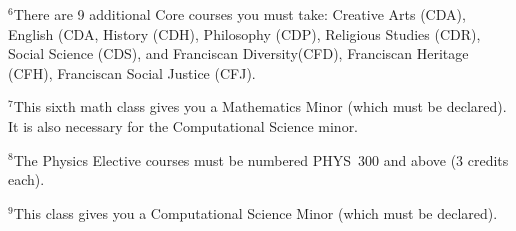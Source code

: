 \documentclass[12pt]{article}
\begin{document}
\hspace{0.1in}$^{6}$There are 9 additional Core courses you must take:  
Creative Arts (CDA), English (CDA, History (CDH), Philosophy (CDP), Religious Studies (CDR), Social Science (CDS), and  Franciscan Diversity(CFD), Franciscan Heritage (CFH), Franciscan Social Justice (CFJ).

\hspace{0.1in}$^{7}$This sixth math class gives you a Mathematics Minor (which
must be declared). It is also necessary for the Computational Science minor. 

\hspace{0.1in}$^{8}$The Physics Elective courses must be  numbered PHYS~300 and above (3 credits each).

\hspace{0.1in}$^{9}$This class gives you a Computational Science Minor (which
must be declared).



\newpage
\end{document}
